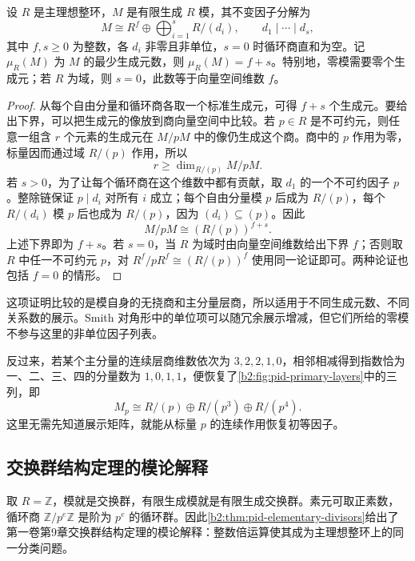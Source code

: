 \begin{corollary}[最少生成元数]\label{b2:cor:pid-minimal-generators}
	设 \(R\) 是主理想整环，\(M\) 是有限生成 \(R\) 模，其不变因子分解为
	\[
		M\cong R^f\oplus\bigoplus_{i=1}^sR/(d_i), \qquad d_1\mid\cdots\mid d_s,
	\]
	其中 \(f,s\ge0\) 为整数，各 \(d_i\) 非零且非单位，\(s=0\) 时循环商直和为空。记 \(\mu_R(M)\) 为 \(M\) 的最少生成元数，则 \(\mu_R(M)=f+s\)。特别地，零模需要零个生成元；若 \(R\) 为域，则 \(s=0\)，此数等于向量空间维数 \(f\)。
\end{corollary}
\begin{proof}
	从每个自由分量和循环商各取一个标准生成元，可得 \(f+s\) 个生成元。要给出下界，可以把生成元的像放到商向量空间中比较。若 \(p\in R\) 是不可约元，则任意一组含 \(r\) 个元素的生成元在 \(M/pM\) 中的像仍生成这个商。商中的 \(p\) 作用为零，标量因而通过域 \(R/(p)\) 作用，所以
	\[
		r\ge\dim_{R/(p)}M/pM.
	\]
	若 \(s>0\)，为了让每个循环商在这个维数中都有贡献，取 \(d_1\) 的一个不可约因子 \(p\)。整除链保证 \(p\mid d_i\) 对所有 \(i\) 成立；每个自由分量模 \(p\) 后成为 \(R/(p)\)，每个 \(R/(d_i)\) 模 \(p\) 后也成为 \(R/(p)\)，因为 \((d_i)\subseteq(p)\)。因此
	\[
		M/pM\cong (R/(p))^{f+s}.
	\]
	上述下界即为 \(f+s\)。若 \(s=0\)，当 \(R\) 为域时由向量空间维数给出下界 \(f\)；否则取 \(R\) 中任一不可约元 \(p\)，对 \(R^f/pR^f\cong(R/(p))^f\) 使用同一论证即可。两种论证也包括 \(f=0\) 的情形。
\end{proof}

这项证明比较的是模自身的无挠商和主分量层商，所以适用于不同生成元数、不同关系数的展示。Smith 对角形中的单位项可以随冗余展示增减，但它们所给的零模不参与这里的非单位因子列表。

\ProseParagraphBreak
反过来，若某个主分量的连续层商维数依次为 \(3,2,2,1,0\)，相邻相减得到指数恰为一、二、三、四的分量数为 \(1,0,1,1\)，便恢复了\cref{b2:fig:pid-primary-layers}中的三列，即
\[
	M_p\cong R/(p)\oplus R/(p^3)\oplus R/(p^4).
\]
这里无需先知道展示矩阵，就能从标量 \(p\) 的连续作用恢复初等因子。

\subsection{交换群结构定理的模论解释}
\label{b2:subsec:0403:03}

取 \(R=\mathbb Z\)，模就是交换群，有限生成模就是有限生成交换群。素元可取正素数，循环商 \(\mathbb Z/p^e\mathbb Z\) 是阶为 \(p^e\) 的循环群。因此\cref{b2:thm:pid-elementary-divisors}给出了第一卷第9章交换群结构定理的模论解释：整数倍运算使其成为主理想整环上的同一分类问题。


